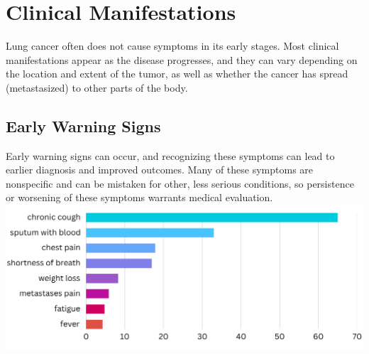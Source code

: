 \section{Clinical Manifestations}

Lung cancer often does not cause symptoms in its early stages. Most clinical manifestations appear 
as the disease progresses, and they can vary depending on the location and extent of the tumor, as 
well as whether the cancer has spread (metastasized) to other parts of the body.

\subsection{Early Warning Signs}

Early warning signs can occur, and recognizing these symptoms can lead to earlier diagnosis and 
improved outcomes. Many of these symptoms are nonspecific and can be mistaken for other, less 
serious conditions, so persistence or worsening of these symptoms warrants medical evaluation.\\

\includegraphics[width=\textwidth]{../assets/03-clinical/early-signs.png}  

